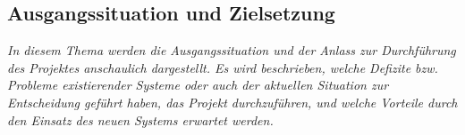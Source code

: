 \subsection{Ausgangssituation und Zielsetzung}

\textit{
    In diesem Thema werden die Ausgangssituation und der Anlass zur Durchführung des Projektes anschaulich dargestellt. Es wird beschrieben, welche Defizite bzw. Probleme existierender Systeme oder auch der aktuellen Situation zur Entscheidung geführt haben, das Projekt durchzuführen, und welche Vorteile durch den Einsatz des neuen Systems erwartet werden.
}

